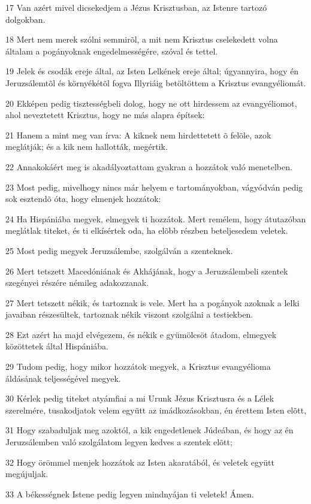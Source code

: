 \par 17 Van azért mivel dicsekedjem a Jézus Krisztusban, az Istenre tartozó dolgokban.
\par 18 Mert nem merek szólni semmirõl, a mit nem Krisztus cselekedett volna általam a pogányoknak engedelmességére, szóval és tettel.
\par 19 Jelek és csodák ereje által, az Isten Lelkének ereje által; úgyannyira, hogy én Jeruzsálemtõl és környékétõl fogva Illyriáig betöltöttem a Krisztus evangyéliomát.
\par 20 Ekképen pedig tisztességbeli dolog, hogy ne ott hirdessem az evangyéliomot, ahol neveztetett Krisztus, hogy ne más alapra építsek:
\par 21 Hanem a mint meg van írva: A kiknek nem hirdettetett õ felõle, azok meglátják; és a kik nem hallották, megértik.
\par 22 Annakokáért meg is akadályoztattam gyakran a hozzátok való menetelben.
\par 23 Most pedig, mivelhogy nincs már helyem e tartományokban, vágyódván pedig sok esztendõ óta, hogy elmenjek hozzátok:
\par 24 Ha Hispániába megyek, elmegyek ti hozzátok. Mert remélem, hogy átutazóban meglátlak titeket, és ti elkísértek oda, ha elõbb részben beteljesedem veletek.
\par 25 Most pedig megyek Jeruzsálembe, szolgálván a szenteknek.
\par 26 Mert tetszett Macedóniának és Akhájának, hogy a Jeruzsálembeli szentek szegényei részére némileg adakozzanak.
\par 27 Mert tetszett nékik, és tartoznak is vele. Mert ha a pogányok azoknak a lelki javaiban részesültek, tartoznak nékik viszont szolgálni a  testiekben.
\par 28 Ezt azért ha majd elvégezem, és nékik e gyümölcsöt átadom, elmegyek közöttetek által Hispániába.
\par 29 Tudom pedig, hogy mikor hozzátok megyek, a Krisztus evangyélioma áldásának teljességével megyek.
\par 30 Kérlek pedig titeket atyámfiai a mi Urunk Jézus Krisztusra és a Lélek szerelmére, tusakodjatok velem együtt az imádkozásokban, én érettem Isten elõtt,
\par 31 Hogy szabaduljak meg azoktól, a kik engedetlenek Júdeában, és hogy az én Jeruzsálemben való szolgálatom legyen kedves a szentek elõtt;
\par 32 Hogy örömmel menjek hozzátok az Isten akaratából, és veletek együtt megújuljak.
\par 33 A békességnek Istene pedig legyen mindnyájan ti veletek! Ámen.

